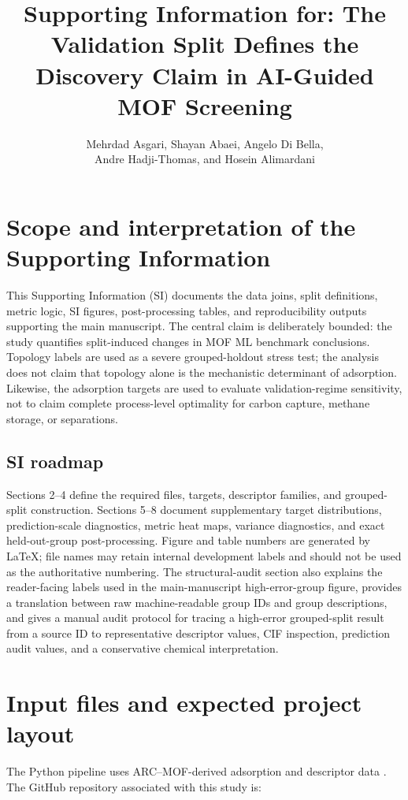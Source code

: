 \documentclass[11pt,a4paper]{article}
\title{\textbf{Supporting Information for: The Validation Split Defines the Discovery Claim in AI-Guided MOF Screening}}
\author{Mehrdad Asgari, Shayan Abaei, Angelo Di Bella,\\ Andre Hadji-Thomas, and Hosein Alimardani}
\date{}
\begin{document}
\maketitle
\begingroup
\sloppy
\tableofcontents
\endgroup
\clearpage
\section[Scope and interpretation]{Scope and interpretation of the Supporting Information}
This Supporting Information (SI) documents the data joins, split definitions, metric logic,
SI figures, post-processing tables, and reproducibility outputs supporting the main manuscript.
The central claim is deliberately bounded: the study quantifies split-induced changes in MOF ML benchmark
conclusions. Topology labels are used as a severe grouped-holdout stress test; the analysis does not claim
that topology alone is the mechanistic determinant of adsorption. Likewise, the adsorption targets are
used to evaluate validation-regime sensitivity, not to claim complete process-level optimality for carbon
capture, methane storage, or separations.


\subsection*{SI roadmap}
 Sections 2--4 define the required files, targets, descriptor families, and grouped-split construction. Sections 5--8 document supplementary target distributions, prediction-scale diagnostics, metric heat maps, variance diagnostics, and exact held-out-group post-processing. Figure and table numbers are generated by LaTeX; file names may retain internal development labels and should not be used as the authoritative numbering.
The structural-audit section also explains the reader-facing labels used in the main-manuscript high-error-group figure, provides a translation between raw machine-readable group IDs and group descriptions, and gives a manual audit protocol for tracing a high-error grouped-split result from a source ID to representative descriptor values, CIF inspection, prediction audit values, and a conservative chemical interpretation.


\section{Input files and expected project layout}

The Python pipeline uses ARC--MOF-derived adsorption and descriptor data \citep{Burner2023ARCMOF}. The GitHub repository associated with this study is:
\end{document}
